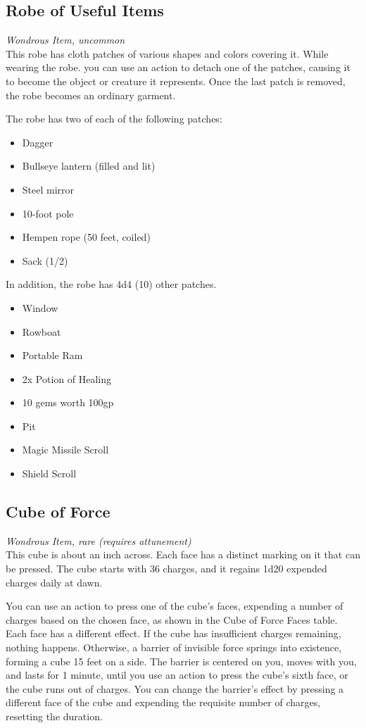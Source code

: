 \documentclass[letterpaper,openany,oneside,twocolumn]{book}
\begin{document}
\subsection*{Robe of Useful Items}
\textit{Wondrous Item, uncommon}\\
This robe has cloth patches of various shapes and colors covering it. While wearing the robe. you can use an action to detach one of the patches, causing it to become the object or creature it represents. Once the last patch is removed, the robe becomes an ordinary garment.

The robe has two of each of the following patches:
\begin{itemize}
	\item Dagger
	\item Bullseye lantern (filled and lit)
	\item Steel mirror
	\item 10-foot pole
	\item Hempen rope (50 feet, coiled)
	\item Sack (1/2)
\end{itemize}
In addition, the robe has 4d4 (10) other patches.
\begin{itemize}
	\item Window
	\item Rowboat
	\item Portable Ram
	\item 2x Potion of Healing
	\item 10 gems worth 100gp
	\item Pit
	\item Magic Missile Scroll
	\item Shield Scroll
\end{itemize}
\subsection*{Cube of Force}
\textit{Wondrous Item, rare (requires attunement)}\\
This cube is about an inch across. Each face has a distinct marking on it that can be pressed. The cube starts with 36 charges, and it regains 1d20 expended charges daily at dawn.

You can use an action to press one of the cube's faces, expending a number of charges based on the chosen face, as shown in the Cube of Force Faces table. Each face has a different effect. If the cube has insufficient charges remaining, nothing happens. Otherwise, a barrier of invisible force springs into existence, forming a cube 15 feet on a side. The barrier is centered on you, moves with you, and lasts for 1 minute, until you use an action to press the cube's sixth face, or the cube runs out of charges. You can change the barrier's effect by pressing a different face of the cube and expending the requisite number of charges, resetting the duration.
\end{document}
